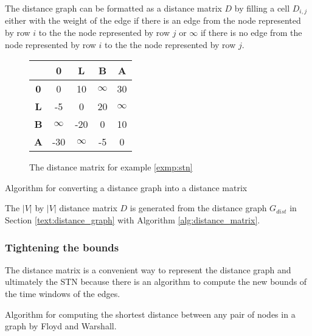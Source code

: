 \documentclass{article}
\theoremstyle{definition}
\providecommand{\SetAlgoLined}{\SetLine}
\newcommand{\weight}[2]{\ensuremath{weight(t_{#1}, t_{#2})}} %
\newenvironment{definition}[1][Definition]{\begin{trivlist}
\item[\hskip \labelsep {\bfseries #1}]}{\end{trivlist}}
\begin{document}
The distance graph can be formatted as a distance matrix $D$ by filling a cell $D_{i,j}$ either with the weight of the edge if there is an edge from the node represented by row $i$ to the the node represented by row $j$ or $\infty$ if there is no edge from the node represented by row $i$ to the the node represented by row $j$.

\begin{figure}[h]
	\centering
	\begin{tabular}{ c | c c c c }
	  			& \textbf{0}	& \textbf{L} 	& \textbf{B} 	& \textbf{A} \\ \hline
	  \textbf{0} 	& 0 			& 10		& $\infty$ 	& 30 \\
	  \textbf{L} 	& -5 		& 0			& 20		& $\infty$ \\
	  \textbf{B} 	& $\infty$ 	& -20		& 0			& 10 \\
	  \textbf{A} 	& -30		& $\infty$	& -5 		& 0 \\
	\end{tabular}
	\caption{The distance matrix for example \ref{exmp:stn}}
	\label{fig:distance_matrix}
\end{figure}

\begin{algorithm}[H]
\label{alg:distance_matrix}
\SetAlgoLined
\ForAll{$(t_i, t_j) \in E_{dist}$}{
	$D_{ij} = \weight{i}{j}$\;
}
\caption{Algorithm for converting a distance graph into a distance matrix}
\end{algorithm}

\begin{definition}
The $|V|$ by $|V|$ distance matrix $D$ is generated from the distance graph $G_{dist}$ in Section \ref{text:distance_graph} with Algorithm \ref{alg:distance_matrix}.
\end{definition}

\subsubsection{Tightening the bounds}
\label{text:floyd}
The distance matrix is a convenient way to represent the distance graph and ultimately the STN because there is an algorithm to compute the new bounds of the time windows of the edges. 

\begin{algorithm}[H]
\label{alg:floyd}
\SetAlgoLined
{}
\caption{Algorithm for computing the shortest distance between any pair of nodes in a graph by Floyd and Warshall. }
\end{algorithm}
\end{document}
